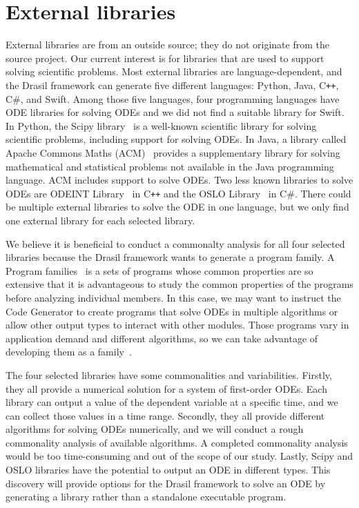\chapter{External libraries}
\label{cha_extlib}
External libraries are from an outside source; they do not originate from the source project. Our current interest is for libraries that are used to support solving scientific problems. Most external libraries are language-dependent, and the Drasil framework can generate five different languages: Python, Java, C\texttt{++}, C\#, and Swift. Among those five languages, four programming languages have ODE libraries for solving ODEs and we did not find a suitable library for Swift. In Python, the Scipy library~\citep{scipy} is a well-known scientific library for solving scientific problems, including support for solving ODEs. In Java, a library called Apache Commons Maths (ACM)~\citep{apache} provides a supplementary library for solving mathematical and statistical problems not available in the Java programming language. ACM includes support to solve ODEs. Two less known libraries to solve ODEs are ODEINT Library~\citep{odeint} in C\texttt{++} and the OSLO Library~\citep{oslo} in C\#. There could be multiple external libraries to solve the ODE in one language, but we only find one external library for each selected library. 

We believe it is beneficial to conduct a commonalty analysis for all four selected libraries because the Drasil framework wants to generate a program family. A Program families~\citep{dp1976} is a sets of programs whose common properties are so extensive that it is advantageous to study the common properties of the programs before analyzing individual members. In this case, we may want to instruct the Code Generator to create programs that solve ODEs in multiple algorithms or allow other output types to interact with other modules. Those programs vary in application demand and different algorithms, so we can take advantage of developing them as a family~\citep{ss2004}.

The four selected libraries have some commonalities and variabilities. Firstly, they all provide a numerical solution for a system of first-order ODEs. Each library can output a value of the dependent variable at a specific time, and we can collect those values in a time range. Secondly, they all provide different algorithms for solving ODEs numerically, and we will conduct a rough commonality analysis of available algorithms. A completed commonality analysis would be too time-consuming and out of the scope of our study. Lastly, Scipy and OSLO libraries have the potential to output an ODE in different types. This discovery will provide options for the Drasil framework to solve an ODE by generating a library rather than a standalone executable program. 

